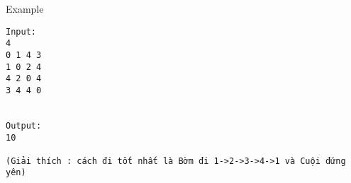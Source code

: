 Example
\begin{verbatim}
Input:
4
0 1 4 3
1 0 2 4
4 2 0 4
3 4 4 0


Output:
10

(Giải thích : cách đi tốt nhất là Bờm đi 1->2->3->4->1 và Cuội đứng yên)
\end{verbatim}